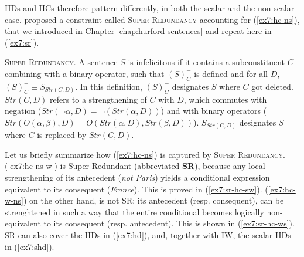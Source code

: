 \begin{exe}
	\ex\label{ex7:hc-ns}
	\begin{xlist}
		\label{ex7:hc-w-ns}
		\label{ex7:hc-ns-w}
	\end{xlist}
\end{exe}



\begin{exe}
	\ex\label{ex7:hc-s}
	\begin{xlist}
		\label{ex7:hc-scalar-w-ns}
		\label{ex7:hc-scalar-ns-w}
	\end{xlist}
\end{exe}



HDs and HCs therefore pattern differently, in both the scalar and the non-scalar case. \citet{Kalomoiros2024} proposed a constraint called \textsc{Super Redundancy} accounting for (\ref{ex7:hc-ns}), that we introduced in Chapter \ref{chap:hurford-sentences} and repeat here in (\ref{ex7:sr}).

\begin{exe}
	\ex \textsc{Super Redundancy}. A sentence $S$ is infelicitous if it contains a subconstituent $C$ combining with a binary operator, such that $(S)^-_C$ is defined and for all $D$, $(S)^-_C \equiv S_{Str(C, D)}$. In this definition, $(S)^-_C$ designates $S$ where $C$ got deleted. $Str(C, D)$ refers to a strengthening of $C$ with $D$, which commutes with negation ($Str(\neg\alpha, D) = \neg (Str(\alpha, D))$) and with binary operators ($Str(O(\alpha, \beta), D) = O(Str(\alpha, D), Str(\beta, D))$). $S_{Str(C, D)}$ designates $S$ where $C$ is replaced by $Str(C, D)$.\label{ex7:sr}
\end{exe}

Let us briefly summarize how (\ref{ex7:hc-ns}) is captured by \textsc{Super Redundancy}. (\ref{ex7:hc-ns-w}) is Super Redundant (abbreviated \textbf{SR}), because any local strengthening of its antecedent (\textit{not Paris}) yields a conditional expression equivalent to its consequent (\textit{France}). This is proved in (\ref{ex7:sr-hc-sw}). (\ref{ex7:hc-w-ns}) on the other hand, is not SR: its antecedent (resp. consequent), can be strenghtened in such a way that the entire conditional becomes logically non-equivalent to its consequent (resp. antecedent). This is shown in (\ref{ex7:sr-hc-ws}). SR can also cover the HDs in (\ref{ex7:hd}), and, together with IW, the scalar HDs in (\ref{ex7:shd}).


